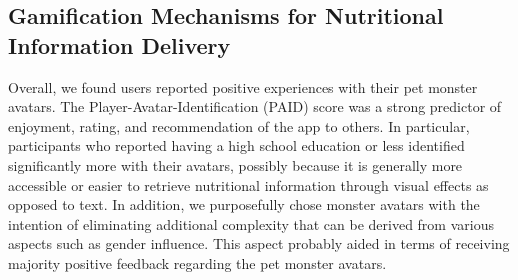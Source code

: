 


\vspace{-5pt}
\subsection{Gamification Mechanisms for Nutritional Information Delivery }
Overall, we found users reported positive experiences with their pet monster avatars. The Player-Avatar-Identification (PAID) score was a strong predictor of enjoyment, rating, and recommendation of the app to others. 
In particular, participants who reported having a high school education or less identified significantly more with their avatars, possibly because it is generally more accessible or easier to retrieve nutritional information through visual effects as opposed to text. In addition, we purposefully chose monster avatars with the intention of eliminating additional complexity that can be derived from various aspects such as gender influence. This aspect probably aided in terms of receiving majority positive feedback regarding the pet monster avatars.  

